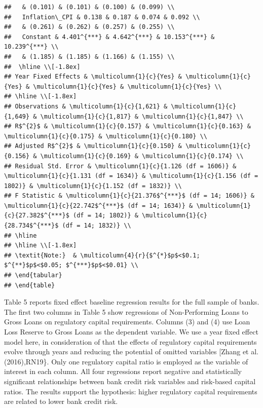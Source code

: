 \documentclass{article}
\begin{document}
\begin{verbatim}
##   & (0.101) & (0.101) & (0.100) & (0.099) \\ 
##   Inflation\_CPI & 0.138 & 0.187 & 0.074 & 0.092 \\ 
##   & (0.261) & (0.262) & (0.257) & (0.255) \\ 
##   Constant & 4.401^{***} & 4.642^{***} & 10.153^{***} & 10.239^{***} \\ 
##   & (1.185) & (1.185) & (1.166) & (1.155) \\ 
##  \hline \\[-1.8ex] 
## Year Fixed Effects & \multicolumn{1}{c}{Yes} & \multicolumn{1}{c}{Yes} & \multicolumn{1}{c}{Yes} & \multicolumn{1}{c}{Yes} \\ 
## \hline \\[-1.8ex] 
## Observations & \multicolumn{1}{c}{1,621} & \multicolumn{1}{c}{1,649} & \multicolumn{1}{c}{1,817} & \multicolumn{1}{c}{1,847} \\ 
## R$^{2}$ & \multicolumn{1}{c}{0.157} & \multicolumn{1}{c}{0.163} & \multicolumn{1}{c}{0.175} & \multicolumn{1}{c}{0.180} \\ 
## Adjusted R$^{2}$ & \multicolumn{1}{c}{0.150} & \multicolumn{1}{c}{0.156} & \multicolumn{1}{c}{0.169} & \multicolumn{1}{c}{0.174} \\ 
## Residual Std. Error & \multicolumn{1}{c}{1.126 (df = 1606)} & \multicolumn{1}{c}{1.131 (df = 1634)} & \multicolumn{1}{c}{1.156 (df = 1802)} & \multicolumn{1}{c}{1.152 (df = 1832)} \\ 
## F Statistic & \multicolumn{1}{c}{21.376$^{***}$ (df = 14; 1606)} & \multicolumn{1}{c}{22.742$^{***}$ (df = 14; 1634)} & \multicolumn{1}{c}{27.382$^{***}$ (df = 14; 1802)} & \multicolumn{1}{c}{28.734$^{***}$ (df = 14; 1832)} \\ 
## \hline 
## \hline \\[-1.8ex] 
## \textit{Note:}  & \multicolumn{4}{r}{$^{*}$p$<$0.1; $^{**}$p$<$0.05; $^{***}$p$<$0.01} \\ 
## \end{tabular} 
## \end{table}
\end{verbatim}

Table 5 reports fixed effect baseline regression results for the full
sample of banks. The first two columns in Table 5 show regressions of
Non-Performing Loans to Gross Loans on regulatory capital requirements.
Columns (3) and (4) use Loan Loss Reserve to Gross Loans as the
dependent variable. We use a year fixed effect model here, in
consideration of that the effects of regulatory capital requirements
evolve through years and reducing the potential of omitted variables
{[}Zhang et al. (2016),RN19\}. Only one regulatory capital ratio is
employed as the variable of interest in each column. All four
regressions report negative and statistically significant relationships
between bank credit risk variables and risk-based capital ratios. The
results support the hypothesis: higher regulatory capital requirements
are related to lower bank credit risk.
\end{document}
